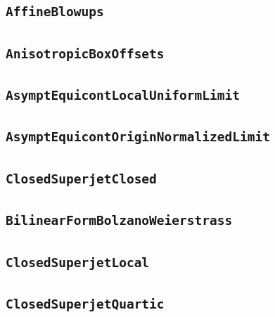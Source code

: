 \documentclass[11pt]{amsart}
\theoremstyle{definition}
\begin{document}
\subsection{\texorpdfstring{\texttt{AffineBlowups}}{AffineBlowups}}\label{node:AffineBlowups}


\subsection{\texorpdfstring{\texttt{AnisotropicBoxOffsets}}{AnisotropicBoxOffsets}}\label{node:AnisotropicBoxOffsets}


\subsection{\texorpdfstring{\texttt{AsymptEquicontLocalUniformLimit}}{AsymptEquicontLocalUniformLimit}}\label{node:AsymptEquicontLocalUniformLimit}


\subsection{\texorpdfstring{\texttt{AsymptEquicontOriginNormalizedLimit}}{AsymptEquicontOriginNormalizedLimit}}\label{node:AsymptEquicontOriginNormalizedLimit}


\subsection{\texorpdfstring{\texttt{ClosedSuperjetClosed}}{ClosedSuperjetClosed}}\label{node:ClosedSuperjetClosed}


\subsection{\texorpdfstring{\texttt{BilinearFormBolzanoWeierstrass}}{BilinearFormBolzanoWeierstrass}}\label{node:BilinearFormBolzanoWeierstrass}


\subsection{\texorpdfstring{\texttt{ClosedSuperjetLocal}}{ClosedSuperjetLocal}}\label{node:ClosedSuperjetLocal}


\subsection{\texorpdfstring{\texttt{ClosedSuperjetQuartic}}{ClosedSuperjetQuartic}}\label{node:ClosedSuperjetQuartic}

\end{document}
